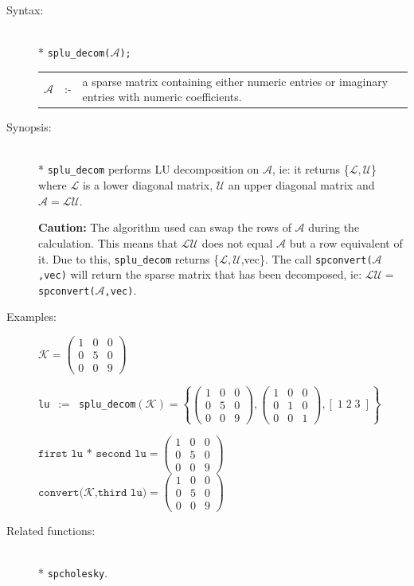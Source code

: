 \begin{description}
\item[Syntax:]\mbox{}\\*
{\tt splu\_decom($\mathcal{A}$);}\\[2mm]
\begin{tabular}{l l p{.848\linewidth}}
$\mathcal{A}$ &:-& a sparse matrix containing either
numeric entries or imaginary entries with numeric coefficients.
\end{tabular}

\item[Synopsis:]\mbox{}\\*
              \texttt{splu\_decom} performs LU decomposition on $\mathcal{A}$,
              ie: it returns \{$\mathcal{L,U}$\} where $\mathcal{L}$
              is a lower diagonal matrix, $\mathcal{U}$ an upper diagonal
              matrix and $\mathcal{A} = \mathcal{LU}$.

\textbf{Caution:}
The algorithm used can swap the rows of $\mathcal{A}$
                during the calculation. This means that $\mathcal{LU}$ does
                not equal $\mathcal{A}$ but a row equivalent of it. Due to
                this, \texttt{splu\_decom} returns \{$\mathcal{L,U}$,vec\}. The
                call {\tt spconvert($\mathcal{A}$,vec)} will return the
                sparse matrix that has been decomposed, ie: $\mathcal{LU} = $
                {\tt spconvert($\mathcal{A}$,vec)}.

\item[Examples:]
\(
\mathcal{K} = \begin{pmatrix} 1 & 0 & 0 \\ 0 & 5 & 0 \\ 0 & 0 & 9 \end{pmatrix}
\)

\texttt{lu}\ $:=$\ \texttt{splu\_decom}\((\mathcal{K}) =
\left\{
        \begin{pmatrix} 1 & 0 & 0 \\ 0 & 5 & 0 \\ 0 & 0 & 9 \end{pmatrix},
        \begin{pmatrix} 1 & 0 & 0 \\ 0 & 1 & 0 \\ 0 & 0 & 1 \end{pmatrix},
	[\; 1 \; 2 \; 3 \; ]
\right\}
\)

\(\texttt{first lu * second lu} =
        \begin{pmatrix} 1 & 0 & 0 \\ 0 & 5 & 0 \\ 0 & 0 & 9 \end{pmatrix}\) \\[2mm]
\(\texttt{convert($\mathcal{K}$,third lu}) =
        \begin{pmatrix} 1 & 0 & 0 \\ 0 & 5 & 0 \\ 0 & 0 & 9 \end{pmatrix}\)

\item[Related functions:]\mbox{}\\*
 \texttt{spcholesky}.
\end{description}

